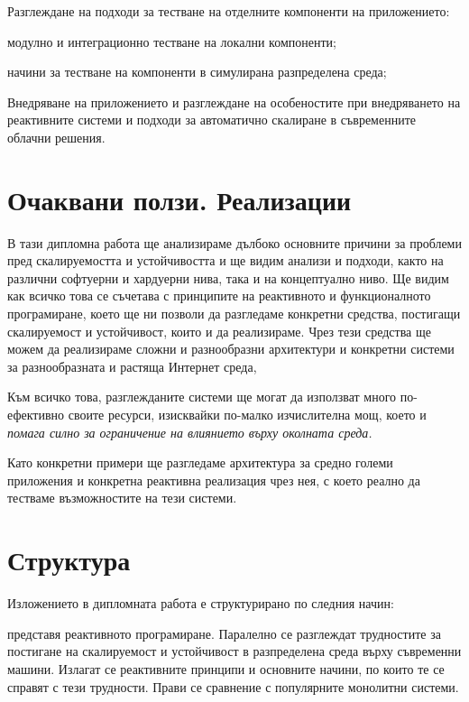 \begin{itemize*}
  \item Разглеждане на подходи за тестване на отделните компоненти на приложението:
  \begin{itemize*}
    \item модулно и интеграционно тестване на локални компоненти;
    \item начини за тестване на компоненти в симулирана разпределена среда;
  \end{itemize*}
  \item Внедряване на приложението и разглеждане на особеностите при внедряването на реактивните системи и подходи за автоматично скалиране в съвременните облачни решения.
\end{itemize*}

\section{Очаквани ползи. Реализации}

В тази дипломна работа ще анализираме дълбоко основните причини за проблеми пред скалируемостта и устойчивостта и ще видим анализи и подходи, както на различни софтуерни и хардуерни нива, така и на концептуално ниво. Ще видим как всичко това се съчетава с принципите на реактивното и функционалното програмиране, което ще ни позволи да разгледаме конкретни средства, постигащи скалируемост и устойчивост, които и да реализираме. Чрез тези средства ще можем да реализираме сложни и разнообразни архитектури и конкретни системи за разнообразната и растяща Интернет среда,

Към всичко това, разглежданите системи ще могат да използват много по-ефективно своите ресурси, изисквайки по-малко изчислителна мощ, което и \emph{помага силно за ограничение на влиянието върху околната среда.}

Като конкретни примери ще разгледаме архитектура за средно големи приложения и конкретна реактивна реализация чрез нея, с което реално да тестваме възможностите на тези системи.

\section{Структура}

Изложението в дипломната работа е структурирано по следния начин:

 представя реактивното програмиране. Паралелно се разглеждат трудностите за постигане на скалируемост и устойчивост в разпределена среда върху съвременни машини. Излагат се реактивните принципи и основните начини, по които те се справят с тези трудности. Прави се сравнение с популярните монолитни системи.

